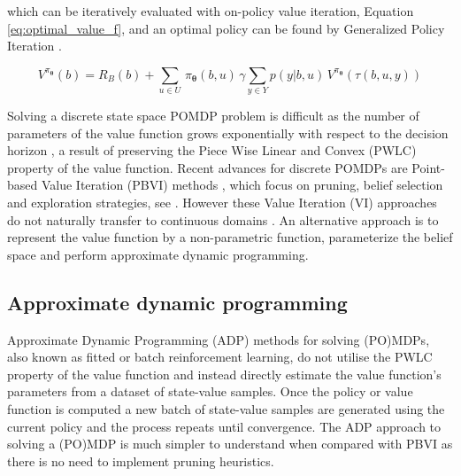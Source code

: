 \documentclass[final,5p,times,twocolumn]{elsarticle}
\newcommand{\Param}{\boldsymbol{\theta}}
\begin{document}
which can be iteratively evaluated with on-policy value iteration, Equation \ref{eq:optimal_value_f}, and an optimal policy can be found 
by Generalized Policy Iteration \cite[Chap. 4.6]{sutton1998reinforcement}.

\begin{equation} \label{eq:optimal_value_f}
  V^{\pi_{\Param}}(b) = R_B(b) + \sum\limits_{u \in U}\, \pi_{\Param}(b,u)\, \gamma \sum\limits_{y\in Y} p(y|b,u)\, V^{\pi_{\Param}}(\tau(b,u,y))
\end{equation}

Solving a discrete state space POMDP problem is difficult as the number of parameters 
of the value function grows exponentially with respect to the decision horizon \cite[Chap. 15]{Thrun_Burgard_Fox_2005}\cite{Sondik_1973},
a result of preserving the Piece Wise Linear and Convex (PWLC) property of the value function. Recent 
advances for discrete POMDPs are Point-based Value Iteration (PBVI) methods \cite{PBVI_2003}, which focus
on pruning, belief selection and exploration strategies, see \cite{Veiga14aaai,POMDP_approach_2010}.
However these Value Iteration (VI) approaches do not naturally transfer to 
continuous domains \cite{cPBVI_2006}. An alternative approach is to represent the value function by a non-parametric function,
parameterize the belief space and perform approximate dynamic programming.


\subsection{Approximate dynamic programming}

%

%


Approximate Dynamic Programming (ADP) methods\cite{approx_rl_overview_2011} for solving (PO)MDPs, also known 
as fitted or batch reinforcement learning, do not utilise the PWLC property of the value function and 
instead directly estimate the value function's parameters from a dataset of state-value samples. 
Once the policy or value function is computed a new batch of state-value samples are generated using 
the current policy and the process repeats until convergence. The ADP approach to solving a (PO)MDP is much 
simpler to understand when compared with PBVI as there is no need to implement pruning heuristics.
\end{document}
